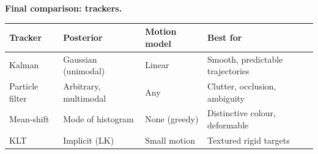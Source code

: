 \textbf{Final comparison: trackers.}

\begin{center}
\renewcommand{\arraystretch}{1.3}
\begin{tabular}{@{} l l l p{4.5cm} @{}}
\toprule
\textbf{Tracker} & \textbf{Posterior} & \textbf{Motion model} & \textbf{Best for} \\
\midrule
Kalman & Gaussian (unimodal) & Linear & Smooth, predictable trajectories \\
Particle filter & Arbitrary, multimodal & Any & Clutter, occlusion, ambiguity \\
Mean-shift & Mode of histogram & None (greedy) & Distinctive colour, deformable \\
KLT & Implicit (LK) & Small motion & Textured rigid targets \\
\bottomrule
\end{tabular}
\end{center}
